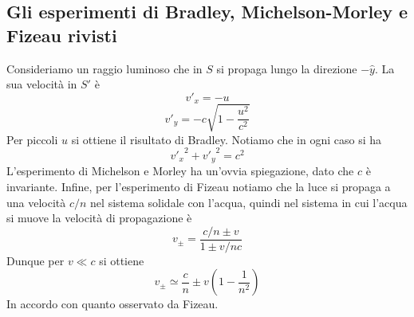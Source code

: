 \documentclass[a4paper,11pt]{book}
\theoremstyle{theorem}
\theoremstyle{definition}
\begin{document}
\subsection{Gli esperimenti di Bradley, Michelson-Morley e Fizeau rivisti}
Consideriamo un raggio luminoso che in $S$ si propaga lungo la direzione $-\hat{y}$. La sua velocità in $S'$ è 
\[v'_x=-u\]
\[v'_y=-c\sqrt{1-\frac{u^2}{c^2}}\]
Per piccoli $u$ si ottiene il risultato di Bradley. Notiamo che in ogni caso si ha
\[{v'_x}^2+{v'_y}^2=c^2\]
L'esperimento di Michelson e Morley ha un'ovvia spiegazione, dato che $c$ è invariante. Infine, per l'esperimento di Fizeau notiamo che la luce si propaga a una velocità $c/n$ nel sistema solidale con l'acqua, quindi nel sistema in cui l'acqua si muove la velocità di propagazione è
\[v_{\pm}=\frac{c/n\pm v}{1\pm v/nc}\]
Dunque per $v\ll c$ si ottiene
\[v_\pm\simeq\frac{c}{n}\pm v\left(1-\frac{1}{n^2}\right)\]
In accordo con quanto osservato da Fizeau.
\end{document}
